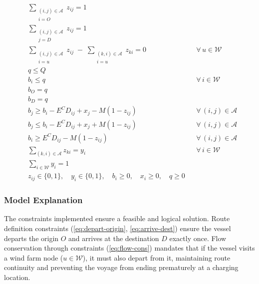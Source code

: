 \begin{align}
&\sum_{\substack{(i,j)\in\mathcal{A}\\ i=O}} z_{ij} = 1 \label{eq:depart-origin}\\[2pt]
&\sum_{\substack{(i,j)\in\mathcal{A}\\ j=D}} z_{ij} = 1 \label{eq:arrive-dest}\\[2pt]
&\sum_{\substack{(i,j)\in\mathcal{A}\\ i=u}} z_{ij}
 \;-\; \sum_{\substack{(k,i)\in\mathcal{A}\\ i=u}} z_{ki} = 0
 && \forall\, u\in\mathcal{W} \label{eq:flow-cons}\\[2pt]
&q \le Q \label{eq:cap-max}\\[2pt]
&b_{i} \le q && \forall\, i\in\mathcal{W} \label{eq:soc-le-q}\\[2pt]
&b_{O} = q \label{eq:soc-origin}\\[2pt]
&b_{D} = q \label{eq:soc-dest}\\[2pt]
&b_{j} \ge b_{i} - E^{C}D_{ij} + x_{j} - M\!\left(1-z_{ij}\right)
 && \forall\, (i,j)\in\mathcal{A} \label{eq:energy-lo}\\[2pt]
&b_{j} \le b_{i} - E^{C}D_{ij} + x_{j} + M\!\left(1-z_{ij}\right)
 && \forall\, (i,j)\in\mathcal{A} \label{eq:energy-hi}\\[2pt]
&b_{i} \ge E^{C}D_{ij} - M\!\left(1-z_{ij}\right)
 && \forall\, (i,j)\in\mathcal{A} \label{eq:energy-suff}\\[2pt]
&\sum_{(k,i)\in\mathcal{A}} z_{ki} = y_{i} && \forall\, i\in\mathcal{W} \label{eq:visit-link}\\[2pt]
&\sum_{i\in\mathcal{W}} y_{i} = 1 \label{eq:one-station}\\[2pt]
&z_{ij}\in\{0,1\},\quad y_{i}\in\{0,1\},\quad b_{i}\ge 0,\quad x_{i}\ge 0,\quad q\ge 0
 \label{eq:domains}
\end{align}

\subsubsection*{Model Explanation}

The constraints implemented ensure a feasible and logical solution. Route definition constraints (\ref{eq:depart-origin}, \ref{eq:arrive-dest}) ensure the vessel departs the origin $O$ and arrives at the destination $D$ exactly once. Flow conservation through constraints (\ref{eq:flow-cons}) mandates that if the vessel visits a wind farm node ($u\in\mathcal{W}$), it must also depart from it, maintaining route continuity and preventing the voyage from ending prematurely at a charging location.

